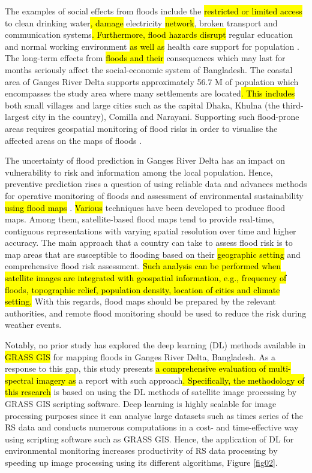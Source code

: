 \documentclass[water,article,submit,pdftex,moreauthors]{Definitions/mdpi}
\begin{document}
The examples of social effects from floods include the \hl{restricted or limited access} to clean drinking water\hl{, damage }electricity \hl{network}, broken transport and communication systems\hl{. Furthermore, flood hazards disrupt} regular education and normal working environment \hl{as well as} health care support for population \cite{JERIN2023103851,NAHIN2023e14520}. The long-term effects from \hl{floods and their} consequences which may last for months  seriously affect the social-economic system of Bangladesh. The coastal area of Ganges River Delta supports approximately 56.7 M of population which encompasses the study area \cite{DAS2021101983} where many settlements are located\hl{. This includes }both small villages and large cities such as the capital Dhaka, Khulna (the third-largest city in the country), Comilla and Narayani. Supporting such flood-prone areas requires geospatial monitoring of flood risks in order to visualise the affected areas on the maps of floods \cite{Alietal,AZAD2023100498}.

The uncertainty of flood prediction in Ganges River Delta has an impact on vulnerability to risk and information among the local population. Hence, preventive prediction rises a question of using reliable data and advances methods for operative monitoring of floods and assessment of environmental sustainability \hl{using flood maps} \cite{NICHOLLS2016370}. \hl{Various} techniques have been developed to produce flood maps. Among them, satellite-based flood maps tend to provide real-time, contiguous representations with varying spatial resolution over time and higher accuracy. The main approach that a country can take to assess flood risk is to map areas that are susceptible to flooding based on their \hl{geographic setting} and\hl{ }comprehensive flood risk assessment. \hl{Such analysis can be performed when satellite images are integrated with geospatial information, e.g., frequency of floods, topographic relief, population density, location of cities and climate setting. }With this regards, flood maps should be prepared by the relevant authorities, and remote flood monitoring should be used to reduce the risk during weather events. 

Notably, no prior study has explored the deep learning (DL) methods available in \hl{GRASS GIS} \cite{GRASS_GIS_software}\hl{ }for mapping floods in Ganges River Delta, Bangladesh. As a response to this gap, this study presents \hl{a comprehensive evaluation of multi-spectral imagery as }a report with such approach\hl{. Specifically, the methodology of this research }is based on using the DL methods of satellite image processing by GRASS GIS scripting software. Deep learning is highly scalable for image processing purposes since it can analyse large datasets such as times series of the RS data and conducts numerous computations in a cost- and time-effective way using scripting software such as GRASS GIS. Hence, the application of DL for environmental monitoring increases productivity of RS data processing by speeding up image processing using its different algorithms, Figure \ref{fig02}. 
\end{document}
